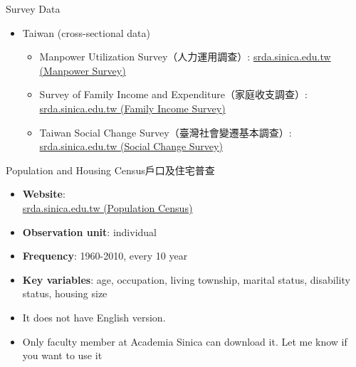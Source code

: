 \documentclass[hyperref={pdfpagelabels=false}]{beamer}
\begin{document}
\begin{frame}{Survey Data}
	\begin{itemize} 
		\item Taiwan (cross-sectional data)
		\begin{itemize} 
			\vspace{0.3cm}
			
			\item Manpower Utilization Survey（人力運用調查）: \href{https://srda.sinica.edu.tw/search/metadata/detail/AA020047}{srda.sinica.edu.tw (Manpower Survey)} 
			\vspace{0.3cm}
			\item Survey of Family Income and Expenditure（家庭收支調查）: \href{https://srda.sinica.edu.tw/plan/?idx=SRDA.GS016}{srda.sinica.edu.tw (Family Income Survey)}  
			\vspace{0.3cm}
			\item Taiwan Social Change Survey（臺灣社會變遷基本調查）: \href{https://srda.sinica.edu.tw/search/metadata/detail/C00390_1}{srda.sinica.edu.tw (Social Change Survey)}
			
		\end{itemize}
		
	\end{itemize}
\end{frame}





\begin{frame}{Population and Housing Census}{戶口及住宅普查}
\begin{itemize} 
\item \textbf{Website}: \\ \href{https://srda.sinica.edu.tw/plan/?idx=SRDA.GS017}{srda.sinica.edu.tw (Population Census)}
\vspace{0.2cm}

\item \textbf{Observation unit}: individual
\vspace{0.2cm}
\item \textbf{Frequency}: 1960-2010, every 10 year
\vspace{0.2cm}
\item \textbf{Key variables}: age, occupation, living township, marital status, disability status, housing size
\vspace{0.2cm}
\item It does not have English version. 
\vspace{0.2cm}
\item Only faculty member at Academia Sinica can download it. Let me know if you want to use it


\end{itemize}
\end{frame}
\end{document}
